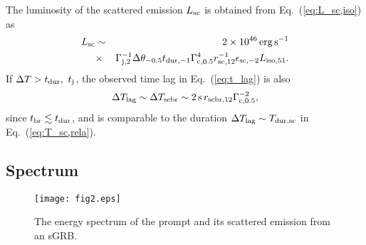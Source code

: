 \documentclass{emulateapj}
\begin{document}
The luminosity of the scattered emission $L_{\rm sc}$ is obtained from Eq.~(\ref{eq:L_sc,iso}) as
\begin{eqnarray}\label{eq:L_sc,rela}
L_{\rm sc} &\sim& 2\times10^{46}\,{\rm erg}\,{\rm s}^{-1}
\nonumber\\
&\times& \Gamma_{\rm j,2}^{-1} \Delta \theta_{-0.5} 
t_{\rm dur,-1} \Gamma_{\rm c,0.5}^4 r_{\rm sc,12}^{-1} \epsilon_{\rm sc,-2} L_{\rm iso,51}.
\end{eqnarray}
If $\Delta T > t_{\rm dur},~t_{\rm j}$,
the observed time lag in Eq.~(\ref{eq:t_lag}) is also
\begin{eqnarray}\label{eq:T_lag,rela}
\Delta T_{\rm lag}\sim\Delta T_{\rm scbr}\sim  2\,{\rm s}\, r_{\rm scbr,12} \Gamma_{\rm c,0.5}^{-2},
\end{eqnarray}
since $t_{\rm br} \lesssim t_{\rm dur}$,
and is comparable to the duration $\Delta T_{\rm lag} \sim T_{\rm dur, sc}$
in Eq.~(\ref{eq:T_sc,rela}).

\subsection{Spectrum}\label{sec:spec}

\begin{figure*}
 \begin{center}
  \texttt{[image: fig2.eps]}
   \caption{The energy spectrum of the prompt and its scattered emission from an sGRB.}
  \label{fig:spectrum}
 \end{center}
\end{figure*}
\end{document}
